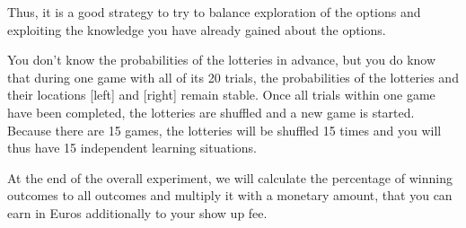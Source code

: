 \documentclass[12pt, oneside]{scrartcl}
\begin{document}
Thus, it is a good strategy to try to balance exploration of the options and exploiting the knowledge you have already gained about the options. \vspace{\baselineskip}

You don’t know the probabilities of the lotteries in advance, but you do know that during one game with all of its 20 trials, the probabilities of the lotteries and their locations [left] and [right] remain stable. Once all trials within one game have been completed, the lotteries are shuffled and a new game is started. Because there are 15 games, the lotteries will be shuffled 15 times and you will thus have 15 independent learning situations.

At the end of the overall experiment, we will calculate the percentage of winning outcomes to all outcomes and multiply it with a monetary amount, that you can earn in Euros additionally to your show up fee.


\pagebreak
\end{document}

